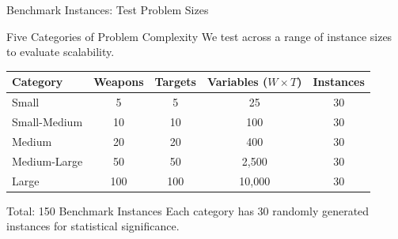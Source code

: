 \documentclass[aspectratio=43,8pt]{beamer}
\begin{document}
\begin{frame}{Benchmark Instances: Test Problem Sizes}
\begin{block}{Five Categories of Problem Complexity}
We test across a range of instance sizes to evaluate scalability.
\end{block}

\vspace{0.2cm}
\begin{table}[h]
\centering
\begin{tabular}{lcccc}
\toprule
\textbf{Category} & \textbf{Weapons} & \textbf{Targets} & \textbf{Variables ($W \times T$)} & \textbf{Instances} \\
\midrule
Small & 5 & 5 & 25 & 30 \\
Small-Medium & 10 & 10 & 100 & 30 \\
Medium & 20 & 20 & 400 & 30 \\
Medium-Large & 50 & 50 & 2,500 & 30 \\
Large & 100 & 100 & 10,000 & 30 \\
\bottomrule
\end{tabular}
\end{table}

\begin{alertblock}{Total: 150 Benchmark Instances}
Each category has 30 randomly generated instances for statistical significance.
\end{alertblock}
\end{frame}
\end{document}
